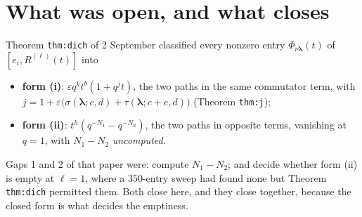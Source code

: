\documentclass[11pt]{article}
\theoremstyle{definition}
\theoremstyle{remark}
\newcommand{\bl}{\boldsymbol{\lambda}}
\begin{document}
\begin{abstract}
Verification: $1604/1604$ in sample; $1564/1564$ out of sample over seven configurations,
including $\ell=4$, which exhibits $|N_1-N_2|=3$, a value outside every in-sample range
and inside the one now proved. Thirteen negative controls, each checked non-degenerate
before being scored, all fail; the floor (the constant $N_1-N_2\equiv1$) is
$1530/3168$.

\textbf{Scope, stated here and not in a closing remark.} Proposition \texttt{prop:heis}
of 31 August shows $R^{(\ell)}(-q^{-1})\neq B^{[e]}_{-1}$ for $\ell\ge2$. What is
classified below is therefore the commutator of a concretely defined graded ribbon
operator, and \emph{not} known to be a statement about the level-$\ell$ Heisenberg
action on Fock space. Nothing in this paper narrows that gap.
\end{abstract}

\section{What was open, and what closes}\label{sec:summary}

Theorem \texttt{thm:dich} of 2 September classified every nonzero entry
$\Phi_{\nu\bl}(t)$ of $[e_i,R^{(\ell)}(t)]$ into

\begin{itemize}
\item \textbf{form (i)}: $\varepsilon q^{k}t^{b}(1+q^{j}t)$, the two paths in the same
commutator term, with
$j=1+\varepsilon\big(\sigma(\bl;c,d)+\tau(\bl;c+e,d)\big)$ (Theorem \texttt{thm:j});
\item \textbf{form (ii)}: $t^{h}(q^{-N_1}-q^{-N_2})$, the two paths in opposite terms,
vanishing at $q=1$, with $N_1-N_2$ \emph{uncomputed}.
\end{itemize}

Gaps 1 and 2 of that paper were: compute $N_1-N_2$; and decide whether form (ii) is
empty at $\ell=1$, where a $350$-entry sweep had found none but Theorem \texttt{thm:dich}
permitted them. Both close here, and they close together, because the closed form is what
decides the emptiness.
\end{document}
